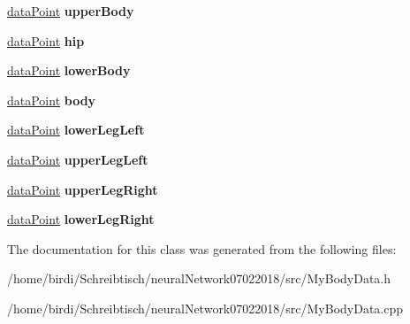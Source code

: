 \begin{DoxyCompactItemize}
\mbox{\label{classMyBodyData_a148d4697af3060eab925ae76ac0dbf68}} 
\mbox{\hyperlink{structdataPoint}{data\+Point}} {\bfseries upper\+Body}
\item 
\mbox{\label{classMyBodyData_a0f5d6743f75cb498126d49734b14e3c1}} 
\mbox{\hyperlink{structdataPoint}{data\+Point}} {\bfseries hip}
\item 
\mbox{\label{classMyBodyData_aa4550ff5b5ef8ebd983cc21397f336e9}} 
\mbox{\hyperlink{structdataPoint}{data\+Point}} {\bfseries lower\+Body}
\item 
\mbox{\label{classMyBodyData_abc689daee923df5c4f3fca5ffc92d0f9}} 
\mbox{\hyperlink{structdataPoint}{data\+Point}} {\bfseries body}
\item 
\mbox{\label{classMyBodyData_aba84691d109234964b2dbafa8e0eb458}} 
\mbox{\hyperlink{structdataPoint}{data\+Point}} {\bfseries lower\+Leg\+Left}
\item 
\mbox{\label{classMyBodyData_a0a4d4cd3a50832e3b3fe93280eb2dc52}} 
\mbox{\hyperlink{structdataPoint}{data\+Point}} {\bfseries upper\+Leg\+Left}
\item 
\mbox{\label{classMyBodyData_acad3b7c42337127762c2066b6cf2c950}} 
\mbox{\hyperlink{structdataPoint}{data\+Point}} {\bfseries upper\+Leg\+Right}
\item 
\mbox{\label{classMyBodyData_ab0c64f080d95726ad56512be68bbea4d}} 
\mbox{\hyperlink{structdataPoint}{data\+Point}} {\bfseries lower\+Leg\+Right}
\end{DoxyCompactItemize}


The documentation for this class was generated from the following files\+:\begin{DoxyCompactItemize}
\item 
/home/birdi/\+Schreibtisch/neural\+Network07022018/src/My\+Body\+Data.\+h\item 
/home/birdi/\+Schreibtisch/neural\+Network07022018/src/My\+Body\+Data.\+cpp\end{DoxyCompactItemize}
